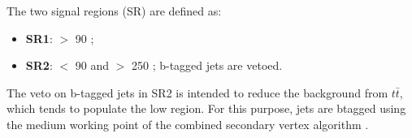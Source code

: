 
The two signal regions (SR) are defined as:
\begin{itemize}
\item {\bf SR1}: \mttwo $>$ 90 \GeV;
\item {\bf SR2}: \mttwo $<$ 90 \GeV and \SumMT $>$ 250 \GeV; b-tagged jets are vetoed.
\end{itemize}
The veto on b-tagged jets in SR2 is intended to reduce
the background from $t\bar{t}$, which
tends to populate the low \mttwo region.  For this purpose, jets are btagged
using the medium working point of the combined secondary vertex algorithm \cite{Chatrchyan:2012jua}. 



